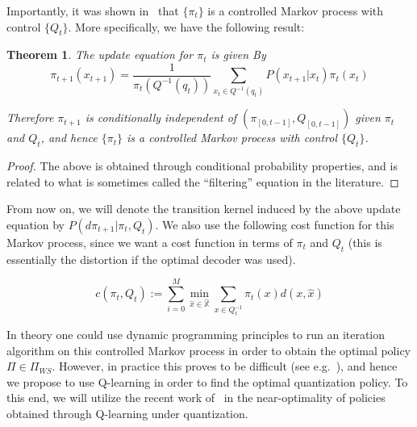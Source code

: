 \documentclass{article}
\newtheorem{theorem}{Theorem}[section]
\begin{document}
Importantly, it was shown in~\cite{Wood} that \( \{\pi_t\} \) is a controlled Markov process with control \( \{Q_t\} \). More specifically, we have the following result:

\begin{theorem}
    The update equation for \(\pi_t\) is given By
    \begin{equation}
        \pi_{t+1}(x_{t+1}) = \frac{1}{\pi_t(Q^{-1}(q_t))}\sum_{x_t \in Q^{-1}(q_t)}P(x_{t+1}|x_t)\pi_t(x_t)\label{eq:1}
    \end{equation}

    Therefore \( \pi_{t+1} \) is conditionally independent of \( (\pi_{[0,t-1]}, Q_{[0,t-1]}) \) given \( \pi_t \) and \( Q_t \), and hence \( \{\pi_t\} \) is a controlled Markov process with control \( \{Q_t\} \).
\end{theorem}

\begin{proof}
    The above is obtained through conditional probability properties, and is related to what is sometimes called the ``filtering'' equation in the literature.
\end{proof}

From now on, we will denote the transition kernel induced by the above update equation by \( P(d\pi_{t+1} | \pi_t, Q_t) \). We also use the following cost function for this Markov process, since we want a cost function in terms of \( \pi_t \) and \( Q_t \) (this is essentially the distortion if the optimal decoder was used).

\begin{equation}\label{eq:cost}
    c(\pi_t, Q_t) := \sum_{i=0}^M \min_{\hat{x} \in \hat{\mathbb{X}}} \sum_{x \in Q_t^{-1}} \pi_t(x)d(x,\hat{x})
\end{equation}

In theory one could use dynamic programming principles to run an iteration algorithm on this controlled Markov process in order to obtain the optimal policy \( \Pi \in \Pi_{WS} \). However, in practice this proves to be difficult (see e.g.~\cite{Wood}), and hence we propose to use Q-learning in order to find the optimal quantization policy. To this end, we will utilize the recent work of~\cite{Kara} in the near-optimality of policies obtained through Q-learning under quantization.
\end{document}
